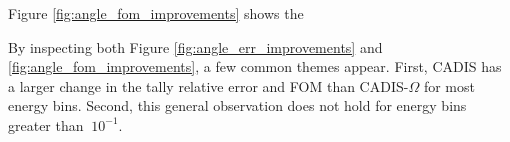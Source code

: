 Figure \ref{fig:angle_fom_improvements} shows the

By inspecting both Figure \ref{fig:angle_err_improvements} and
\ref{fig:angle_fom_improvements}, a few common themes appear. First, CADIS has a
larger change in the tally relative error and FOM than CADIS-$\Omega$ for most
energy bins. Second, this general observation does not hold for energy bins
greater than $~10^{-1}$.



